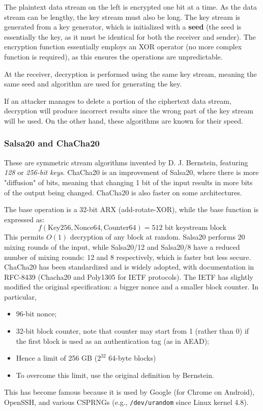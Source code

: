 The plaintext data stream on the left is encrypted one bit at a time. As the data stream can be lengthy, the key stream must also be long. The key stream is generated from a key generator, which is initialized with a \textbf{seed} (the seed is essentially the key, as it must be identical for both the receiver and sender). The encryption function essentially employs an XOR operator (no more complex function is required), as this ensures the operations are unpredictable.

At the receiver, decryption is performed using the same key stream, meaning the same seed and algorithm are used for generating the key.

If an attacker manages to delete a portion of the ciphertext data stream, decryption will produce incorrect results since the wrong part of the key stream will be used. On the other hand, these algorithms are known for their speed.


\subsubsection{Salsa20 and ChaCha20}
These are symmetric stream algorithms invented by D. J. Bernstein, featuring \textit{128} or \textit{256-bit keys}. ChaCha20 is an improvement of Salsa20, where there is more "diffusion" of bits, meaning that changing 1 bit of the input results in more bits of the output being changed. ChaCha20 is also faster on some architectures.

The base operation is a 32-bit ARX (add-rotate-XOR), while the base function is expressed as:
\[ f(\text{{Key256}}, \text{{Nonce64}}, \text{{Counter64}}) = 512 \text{{ bit keystream block}} \]
This permits \(O(1)\) decryption of any block at random. Salsa20 performs 20 mixing rounds of the input, while
Salsa20/12 and Salsa20/8 have a reduced number of mixing rounds: 12 and 8 respectively, which is faster but
less secure.
ChaCha20 has been standardized and is widely adopted, with documentation in RFC-8439 (Chacha20 and
Poly1305 for IETF protocols). The IETF has slightly modified the original specification: a bigger nonce and
a smaller block counter. In particular,
\begin{itemize}
	\item 96-bit nonce;
	\item 32-bit block counter, note that counter may start from 1 (rather than 0) if the first block is used as an authentication tag (as in AEAD);
	\item Hence a limit of 256 GB ($2^{32} $ 64-byte blocks)
	\item To overcome this limit, use the original definition by Bernstein.
\end{itemize}
This has become famous because it is used by Google (for Chrome on Android), OpenSSH, and various CSPRNGs (e.g., \texttt{/dev/urandom} since Linux kernel 4.8).

